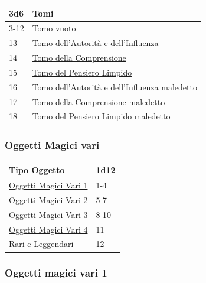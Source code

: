 \begin{multicols}{2}
{\medskip\hypertarget{Tomi}{}

{\small\begin{tabularx}{0.45\textwidth}{lX}
		\toprule
\textbf{3d6} & \textbf{Tomi}\\
\toprule
3-12 & Tomo vuoto\\
13 & \hyperlink{Tomodell'Autoritàedell'Influenza}{Tomo dell'Autorità e dell'Influenza}\\
14 & \hyperlink{TomodellaComprensione}{Tomo della Comprensione}\\
15 & \hyperlink{TomodelPensieroLimpido}{Tomo del Pensiero Limpido}\\
16 & Tomo dell'Autorità e dell'Influenza maledetto\\
17 & Tomo della Comprensione maledetto\\
18 & Tomo del Pensiero Limpido maledetto
\end{tabularx}}

\subsubsection{Oggetti Magici vari}\hypertarget{oggettimagicivari}{}\label{oggettimagicivari}

{\small\begin{tabular}{ll}
		\toprule
\textbf{Tipo Oggetto} & \textbf{1d12}\\
\toprule
\hyperlink{Oggetti Magici Vari 1}{Oggetti Magici Vari 1}&1-4\\
\hyperlink{Oggetti Magici Vari 2}{Oggetti Magici Vari 2}&5-7\\
\hyperlink{Oggetti Magici Vari 3}{Oggetti Magici Vari 3}&8-10\\
\hyperlink{Oggetti Magici Vari 4}{Oggetti Magici Vari 4}&11\\
\hyperlink{Rari e Leggendari}{Rari e Leggendari}&12
\end{tabular}}

\subsubsection{Oggetti magici vari 1}\hypertarget{Oggetti Magici Vari 1}{}

}
\end{multicols}

